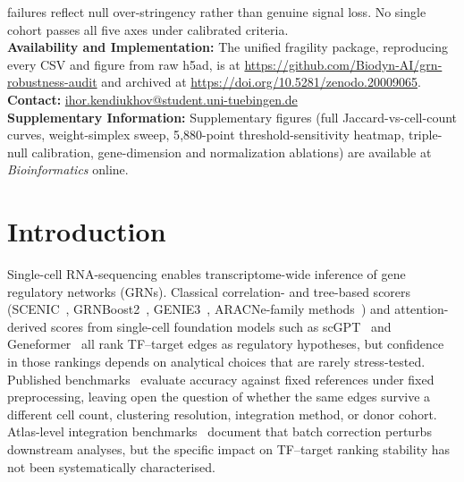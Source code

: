 \documentclass[unnumsec,webpdf,contemporary,large,namedate]{oup-authoring-template}
\begin{document}
{failures reflect null over-stringency rather than genuine signal loss.
No single cohort passes all five axes under calibrated criteria.\\
\textbf{Availability and Implementation:}
The unified fragility package, reproducing every CSV and figure from raw
h5ad, is at \url{https://github.com/Biodyn-AI/grn-robustness-audit} and
archived at \url{https://doi.org/10.5281/zenodo.20009065}.\\
\textbf{Contact:} \href{mailto:ihor.kendiukhov@student.uni-tuebingen.de}{ihor.kendiukhov@student.uni-tuebingen.de}\\
\textbf{Supplementary Information:}
Supplementary figures (full Jaccard-vs-cell-count curves, weight-simplex
sweep, 5{,}880-point threshold-sensitivity heatmap, triple-null calibration,
gene-dimension and normalization ablations) are available at
\textit{Bioinformatics} online.}


\maketitle

\section{Introduction}

Single-cell RNA-sequencing enables transcriptome-wide inference of
gene regulatory networks (GRNs). Classical correlation- and tree-based
scorers (SCENIC~\citep{Aibar2017}, GRNBoost2~\citep{Moerman2019},
GENIE3~\citep{Huynh-Thu2010}, ARACNe-family
methods~\citep{Margolin2006}) and attention-derived scores from
single-cell foundation models such as scGPT~\citep{Cui2024} and
Geneformer~\citep{Theodoris2023} all rank TF--target edges as regulatory
hypotheses, but confidence in those rankings depends on analytical
choices that are rarely stress-tested. Published
benchmarks~\citep{Pratapa2020, Chen2018} evaluate accuracy against
fixed references under fixed preprocessing, leaving open the question
of whether the same edges survive a different cell count, clustering
resolution, integration method, or donor cohort. Atlas-level
integration benchmarks~\citep{Luecken2022, Tran2020} document that
batch correction perturbs downstream analyses, but the specific impact
on TF--target ranking stability has not been systematically
characterised.
\end{document}
